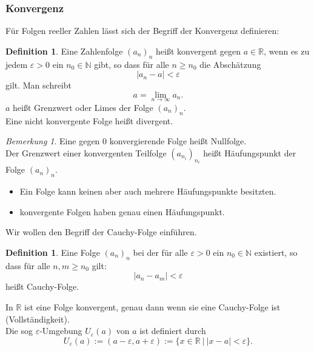 \documentclass[fontsize=12pt,paper=a4,twoside,bibtotoc,idxtotoc,
liststotoc,pagesize,BCOR1.2cm,DIV15,chapterprefix,pagesize=pdftex]{scrbook}
\theoremstyle{plain}
\theoremstyle{definition}
\newtheorem{df}[equation]{Definition}
\theoremstyle{remark}
\newtheorem{bem}[equation]{Bemerkung}
\begin{document}
\subsubsection{Konvergenz}
Für Folgen reeller Zahlen lässt sich der Begriff der Konvergenz definieren:
\begin{df}
Eine Zahlenfolge $(a_n)_n$ heißt konvergent gegen $a\in \mathbb{R}$, wenn es zu jedem
$\varepsilon >0$ ein $n_0 \in \mathbb{N}$ gibt, so dass für alle $n \geq
n_0$ die Abschätzung 
\[ |a_n - a|< \varepsilon \]
 gilt. Man schreibt
\[ a=\lim_{n \rightarrow \infty} a_n. \]
$a$ heißt Grenzwert oder Limes der Folge $(a_n)_n$.\\
Eine nicht konvergente Folge heißt divergent. 
\end{df}
\begin{bem}
Eine gegen $0$ konvergierende Folge heißt Nullfolge.\\
Der Grenzwert einer konvergenten Teilfolge $(a_{n_i})_{n_i}$ heißt Häufungspunkt der Folge $(a_n)_n$.
\begin{itemize}
 \item Ein Folge kann keinen aber auch mehrere Häufungspunkte besitzten.
 \item konvergente Folgen haben genau einen Häufungspunkt.
\end{itemize}
\end{bem}
Wir wollen den Begriff der Cauchy-Folge einführen.
\begin{df}
 Eine Folge $(a_n)_n$ bei der für
alle $\varepsilon>0$ ein $n_0 \in \mathbb{N}$ existiert, so dass für alle
$n,m \geq n_0$ gilt:
\[|a_n - a_m| < \varepsilon\]
heißt Cauchy-Folge.
\end{df}
 In $\mathbb{R}$ ist eine Folge konvergent,
genau dann wenn sie eine Cauchy-Folge ist (Vollständigkeit).\\
Die sog $\varepsilon$-Umgebung $U_\varepsilon(a)$ von $a$ ist
definiert durch
\[
U_\varepsilon(a) := (a-\varepsilon, a+\varepsilon) := \{ x \in \mathbb{R} \ | \ |x - a| < \varepsilon \}.
\] 
\end{document}

